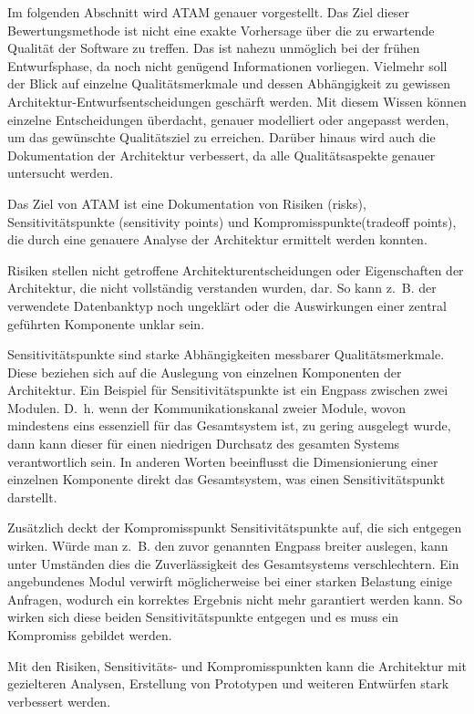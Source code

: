 Im folgenden Abschnitt wird \ac{ATAM} genauer vorgestellt. Das Ziel dieser Bewertungsmethode ist nicht eine exakte Vorhersage über die 
zu erwartende Qualität der Software zu treffen. Das ist nahezu unmöglich bei der frühen Entwurfsphase, da noch nicht genügend Informationen 
vorliegen. Vielmehr soll der Blick auf einzelne Qualitätsmerkmale und dessen Abhängigkeit zu gewissen Architektur-Entwurfsentscheidungen geschärft 
werden\cite{Clements2000}. Mit diesem Wissen können einzelne Entscheidungen überdacht, genauer modelliert oder angepasst werden, um das gewünschte 
Qualitätsziel zu erreichen. Darüber hinaus wird auch die Dokumentation der Architektur verbessert, da alle Qualitätsaspekte genauer untersucht werden.

Das Ziel von \ac{ATAM} ist eine Dokumentation von Risiken (risks), Sensitivitätspunkte (sensitivity points) und Kompromisspunkte(tradeoff points), die durch eine genauere Analyse der Architektur\cite{Clements2000} ermittelt werden konnten.

Risiken stellen nicht getroffene Architekturentscheidungen oder Eigenschaften der Architektur, die nicht vollständig
verstanden wurden, dar. So kann z.~B. der verwendete Datenbanktyp noch ungeklärt oder die Auswirkungen einer zentral geführten Komponente unklar sein.

Sensitivitätspunkte sind starke Abhängigkeiten messbarer Qualitätsmerkmale. Diese beziehen sich auf die Auslegung von einzelnen Komponenten der Architektur. Ein Beispiel für Sensitivitätspunkte ist ein Engpass zwischen zwei Modulen. D.~h. wenn der Kommunikationskanal zweier Module, wovon mindestens eins essenziell für das Gesamtsystem ist, zu gering ausgelegt wurde, dann kann dieser für einen niedrigen Durchsatz des gesamten Systems verantwortlich sein. In anderen Worten beeinflusst die Dimensionierung einer einzelnen Komponente direkt das Gesamtsystem, was einen Sensitivitätspunkt darstellt.

Zusätzlich deckt der Kompromisspunkt Sensitivitätspunkte auf, die sich entgegen wirken.
Würde man z.~B. den zuvor genannten Engpass breiter auslegen, kann unter Umständen dies die Zuverlässigkeit des Gesamtsystems verschlechtern. Ein angebundenes Modul verwirft möglicherweise bei einer starken Belastung einige Anfragen, wodurch ein korrektes Ergebnis nicht mehr garantiert werden kann. So wirken sich diese beiden Sensitivitätspunkte entgegen und es muss ein Kompromiss gebildet werden.  
 
Mit den Risiken, Sensitivitäts- und Kompromisspunkten kann die Architektur mit gezielteren Analysen, Erstellung von Prototypen und weiteren Entwürfen stark verbessert 
werden. 

